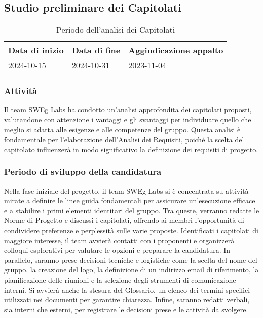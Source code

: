 \vspace{0.5cm}

\subsection{Studio preliminare dei Capitolati}
\begin{table}[h!]
    \centering
    \renewcommand{\arraystretch}{1.5} %
    \begin{tabularx}{\textwidth}{|X|X|X|}\hline
    \rowcolor[HTML]{FFD700} 
    \textbf{Data di inizio} & \textbf{Data di fine} & \textbf{Aggiudicazione appalto} \\ \hline
    2024-10-15 & 2024-10-31 & 2023-11-04 \\ \hline
    \end{tabularx}
    \caption{Periodo dell’analisi dei Capitolati}
\end{table}

\subsubsection{Attività}
Il team SWEg Labs ha condotto un’analisi approfondita dei capitolati proposti, valutandone con attenzione i vantaggi e gli svantaggi per individuare quello che meglio si adatta alle esigenze e alle competenze del gruppo. 
Questa analisi è fondamentale per l’elaborazione dell’Analisi dei Requisiti, poiché la scelta del capitolato influenzerà in modo significativo la definizione dei requisiti di progetto.

\subsubsection{Periodo di sviluppo della candidatura}
Nella fase iniziale del progetto, il team SWEg Labs si è concentrata su attività mirate a definire le linee guida fondamentali per assicurare un'esecuzione efficace e a stabilire i primi elementi identitari del gruppo.
Tra queste, verranno redatte le Norme di Progetto e discussi i capitolati, offrendo ai membri l’opportunità di condividere preferenze e perplessità sulle varie proposte. Identificati i capitolati di maggiore interesse, il team avvierà contatti con i proponenti e organizzerà colloqui esplorativi per valutare le opzioni e preparare la candidatura.
In parallelo, saranno prese decisioni tecniche e logistiche come la scelta del nome del gruppo, la creazione del logo, la definizione di un indirizzo email di riferimento, la pianificazione delle riunioni e la selezione degli strumenti di comunicazione interni. Si avvierà anche la stesura del Glossario, un elenco dei termini specifici utilizzati nei documenti per garantire chiarezza. Infine, saranno redatti verbali, sia interni che esterni, per registrare le decisioni prese e le attività da svolgere.
\newpage
